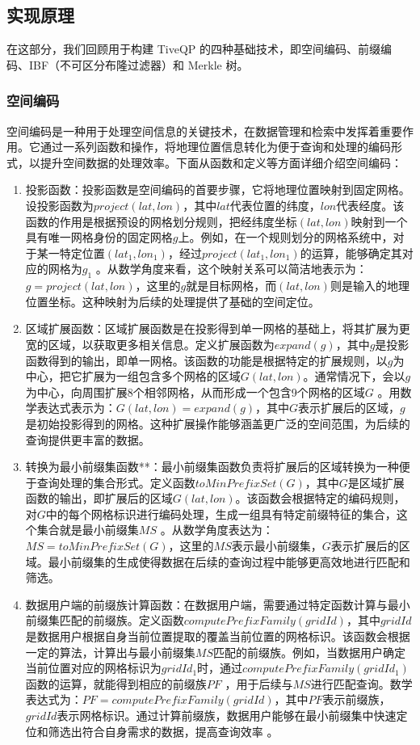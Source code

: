 \documentclass{cumcmthesis}
\numberwithin{equation}{section} %
\numberwithin{figure}{section} %
\numberwithin{table}{section} %
\begin{document}
\subsection{实现原理}

在这部分，我们回顾用于构建 TiveQP 的四种基础技术，即空间编码、前缀编码、IBF（不可区分布隆过滤器）和 Merkle 树。

\subsubsection{空间编码}
空间编码是一种用于处理空间信息的关键技术，在数据管理和检索中发挥着重要作用。它通过一系列函数和操作，将地理位置信息转化为便于查询和处理的编码形式，以提升空间数据的处理效率。下面从函数和定义等方面详细介绍空间编码：
\begin{enumerate}
    \item 投影函数：投影函数是空间编码的首要步骤，它将地理位置映射到固定网格。设投影函数为\(project(lat, lon)\)，其中\(lat\)代表位置的纬度，\(lon\)代表经度。该函数的作用是根据预设的网格划分规则，把经纬度坐标\((lat, lon)\)映射到一个具有唯一网格身份的固定网格\(g\)上。例如，在一个规则划分的网格系统中，对于某一特定位置\((lat_1, lon_1)\)，经过\(project(lat_1, lon_1)\)的运算，能够确定其对应的网格为\(g_1\) 。从数学角度来看，这个映射关系可以简洁地表示为：\(g = project(lat, lon)\)，这里的\(g\)就是目标网格，而\((lat, lon)\)则是输入的地理位置坐标。这种映射为后续的处理提供了基础的空间定位。
    \item 区域扩展函数：区域扩展函数是在投影得到单一网格的基础上，将其扩展为更宽的区域，以获取更多相关信息。定义扩展函数为\(expand(g)\)，其中\(g\)是投影函数得到的输出，即单一网格。该函数的功能是根据特定的扩展规则，以\(g\)为中心，把它扩展为一组包含多个网格的区域\(G(lat, lon)\)。通常情况下，会以\(g\)为中心，向周围扩展8个相邻网格，从而形成一个包含9个网格的区域\(G\) 。用数学表达式表示为：\(G(lat, lon) = expand(g)\)，其中\(G\)表示扩展后的区域，\(g\)是初始投影得到的网格。这种扩展操作能够涵盖更广泛的空间范围，为后续的查询提供更丰富的数据。
    \item 转换为最小前缀集函数**：最小前缀集函数负责将扩展后的区域转换为一种便于查询处理的集合形式。定义函数\(toMinPrefixSet(G)\)，其中\(G\)是区域扩展函数的输出，即扩展后的区域\(G(lat, lon)\)。该函数会根据特定的编码规则，对\(G\)中的每个网格标识进行编码处理，生成一组具有特定前缀特征的集合，这个集合就是最小前缀集\(MS\) 。从数学角度表达为：\(MS = toMinPrefixSet(G)\)，这里的\(MS\)表示最小前缀集，\(G\)表示扩展后的区域。最小前缀集的生成使得数据在后续的查询过程中能够更高效地进行匹配和筛选。
    \item 数据用户端的前缀族计算函数：在数据用户端，需要通过特定函数计算与最小前缀集匹配的前缀族。定义函数\(computePrefixFamily(gridId)\)，其中\(gridId\)是数据用户根据自身当前位置提取的覆盖当前位置的网格标识。该函数会根据一定的算法，计算出与最小前缀集\(MS\)匹配的前缀族。例如，当数据用户确定当前位置对应的网格标识为\(gridId_1\)时，通过\(computePrefixFamily(gridId_1)\)函数的运算，就能得到相应的前缀族\(PF\) ，用于后续与\(MS\)进行匹配查询。数学表达式为：\(PF = computePrefixFamily(gridId)\)，其中\(PF\)表示前缀族，\(gridId\)表示网格标识。通过计算前缀族，数据用户能够在最小前缀集中快速定位和筛选出符合自身需求的数据，提高查询效率 。 
\end{enumerate} 
\end{document}
